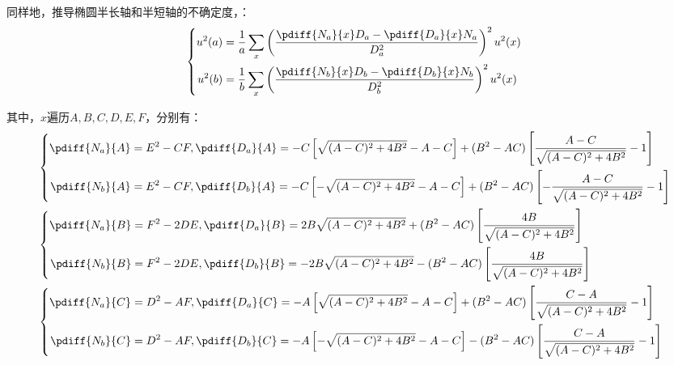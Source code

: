 \documentclass{article}
\begin{document}
同样地，推导椭圆半长轴和半短轴的不确定度，：
\begin{equation}
  \left\{
  \begin{aligned}
    u^2(a)&=\frac{1}{a}\sum_{x}\left(\frac{\pdiff{N_a}{x}D_a-\pdiff{D_a}{x}N_a}{D^2_a}\right)^2u^2(x)\\
    u^2(b)&=\frac{1}{b}\sum_{x}\left(\frac{\pdiff{N_b}{x}D_b-\pdiff{D_b}{x}N_b}{D^2_b}\right)^2u^2(x)\\
  \end{aligned}\right.
\end{equation}\par
其中，$x$遍历$A,B,C,D,E,F$，分别有：
\begin{align*}
  &\left\{
    \begin{aligned}
      \pdiff{N_a}{A}&=E^2-CF,\pdiff{D_a}{A}=-C\left[\sqrt{(A-C)^2+4B^2}-A-C\right]+(B^2-AC)\left[\frac{A-C}{\sqrt{(A-C)^2+4B^2}}-1\right]\\
      \pdiff{N_b}{A}&=E^2-CF,\pdiff{D_b}{A}=-C\left[-\sqrt{(A-C)^2+4B^2}-A-C\right]+(B^2-AC)\left[-\frac{A-C}{\sqrt{(A-C)^2+4B^2}}-1\right]\\ 
    \end{aligned}
  \right.\\
  &\left\{
    \begin{aligned}
      \pdiff{N_a}{B}&=F^2-2DE,\pdiff{D_a}{B}=2B\sqrt{(A-C)^2+4B^2}+(B^2-AC)\left[\frac{4B}{\sqrt{(A-C)^2+4B^2}}\right]\\
      \pdiff{N_b}{B}&=F^2-2DE,\pdiff{D_b}{B}=-2B\sqrt{(A-C)^2+4B^2}-(B^2-AC)\left[\frac{4B}{\sqrt{(A-C)^2+4B^2}}\right]\\ 
    \end{aligned}
  \right.\\
  &\left\{
    \begin{aligned}
      \pdiff{N_a}{C}&=D^2-AF,\pdiff{D_a}{C}=-A\left[\sqrt{(A-C)^2+4B^2}-A-C\right]+(B^2-AC)\left[\frac{C-A}{\sqrt{(A-C)^2+4B^2}}-1\right]\\
      \pdiff{N_b}{C}&=D^2-AF,\pdiff{D_b}{C}=-A\left[-\sqrt{(A-C)^2+4B^2}-A-C\right]-(B^2-AC)\left[\frac{C-A}{\sqrt{(A-C)^2+4B^2}}-1\right]\\ 
    \end{aligned}
  \right.
\end{align*}
\end{document}
